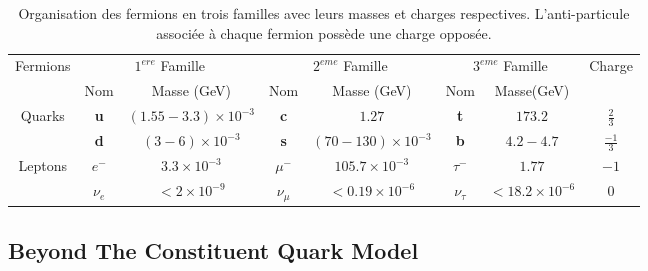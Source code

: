 \begin{table}[h!]
  \centering
  \begin{tabular}{|c|c|c|c|c|c|c|c|}
    \hline
    Fermions & \multicolumn{2}{|c|}{$1^{ere}$ Famille} & \multicolumn{2}{|c|}{$2^{eme}$ Famille} & \multicolumn{2}{|c|}{$3^{eme}$ Famille} & Charge\\
    \cline{2-7}  & Nom & Masse (GeV) & Nom & Masse (GeV) & Nom & Masse(GeV) &  \\
    \hline
    Quarks& \bf{u} & $(1.55-3.3)\times10^{-3}$ & \bf{c} & $1.27$ & \bf{t} & $173.2$ & $\frac{2}{3}$ \\
     & \bf{d} & $(3-6)\times10^{-3}$ & \bf{s} & $(70-130)\times10^{-3}$ & \bf{b} & $4.2-4.7$ & $\frac{-1}{3}$ \\
    \hline
    Leptons & \boldmath$e^-$ & $3.3\times10^{-3}$ & \boldmath$\mu^-$ & $105.7\times10^{-3}$ & \boldmath$\tau^-$ & $1.77$ & ${-1}$ \\
     & \boldmath$\nu_e$ & $<2\times10^{-9}$ & \boldmath$\nu_\mu$ & $<0.19\times10^{-6}$ & \boldmath$\nu_\tau$ & $<18.2\times10^{-6}$ & $0$ \\
    \hline
  \end{tabular}
  \caption{Organisation des fermions en trois familles avec leurs masses et charges respectives. L'anti-particule associ\'ee \`a chaque fermion poss\`ede une charge oppos\'ee.}
  \label{table:1.1}
\end{table}

\subsection{Beyond The Constituent Quark Model}

